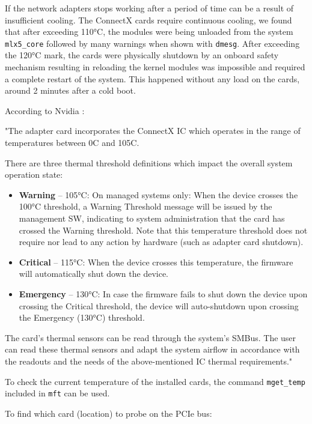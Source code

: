 \documentclass[a4paper,onecolumn]{article}
\begin{document}
If the network adapters stops working after a period of time can be a result of insufficient cooling. The ConnectX cards require continuous cooling, we found that after exceeding 110°C, the modules were being unloaded from the system \verb|mlx5_core| followed by many warnings when shown with \verb|dmesg|. After exceeding the 120°C mark, the cards were physically shutdown by an onboard safety mechanism resulting in reloading the kernel modules was impossible and required a complete restart of the system. This happened without any load on the cards, around 2 minutes after a cold boot.

According to Nvidia \cite{article_nvidia_thermal_sensors}:

"The adapter card incorporates the ConnectX IC which operates in the range of temperatures between 0C and 105C.

There are three thermal threshold definitions which impact the overall system operation state:
\begin{itemize}
\item \textbf{Warning} – 105°C: On managed systems only: When the device crosses the 100°C threshold, a Warning Threshold message will be issued by the management SW, indicating to system administration that the card has crossed the Warning threshold. Note that this temperature threshold does not require nor lead to any action by hardware (such as adapter card shutdown).
 
\item \textbf{Critical} – 115°C: When the device crosses this temperature, the firmware will automatically shut down the device.

\item \textbf{Emergency} – 130°C: In case the firmware fails to shut down the device upon crossing the Critical threshold, the device will auto-shutdown upon crossing the Emergency (130°C) threshold.
\end{itemize}

The card's thermal sensors can be read through the system’s SMBus. The user can read these thermal sensors and adapt the system airflow in accordance with the readouts and the needs of the above-mentioned IC thermal requirements."

To check the current temperature of the installed cards, the command \verb|mget_temp| included in \verb|mft| can be used.

\vspace{5mm} %
To find which card (location) to probe on the PCIe bus:
\end{document}
